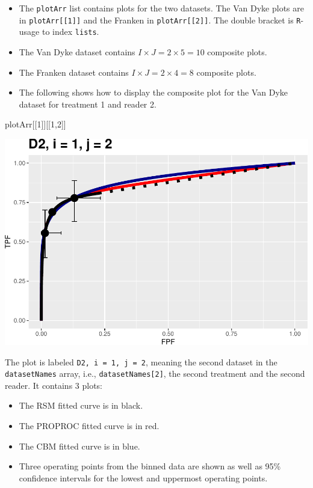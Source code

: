 \documentclass[
]{book}
\newenvironment{Shaded}{\begin{snugshade}}{\end{snugshade}}
\newcommand{\DecValTok}[1]{\textcolor[rgb]{0.00,0.00,0.81}{#1}}
\newcommand{\NormalTok}[1]{#1}
\providecommand{\tightlist}{%
  \setlength{\itemsep}{0pt}\setlength{\parskip}{0pt}}
\begin{document}
\begin{itemize}
\tightlist
\item
  The \texttt{plotArr} list contains plots for the two datasets. The Van Dyke plots are in \texttt{plotArr{[}{[}1{]}{]}} and the Franken in \texttt{plotArr{[}{[}2{]}{]}}. The double bracket is \texttt{R}-usage to index \texttt{lists}.
\item
  The Van Dyke dataset contains \(I \times J = 2 \times 5 = 10\) composite plots.
\item
  The Franken dataset contains \(I \times J = 2 \times 4 = 8\) composite plots.
\item
  The following shows how to display the composite plot for the Van Dyke dataset for treatment 1 and reader 2.
\end{itemize}

\begin{Shaded}
\begin{Highlighting}[]
\NormalTok{plotArr[[}\DecValTok{1}\NormalTok{]][[}\DecValTok{1}\NormalTok{,}\DecValTok{2}\NormalTok{]]}
\end{Highlighting}
\end{Shaded}

\includegraphics{10-rsm-3-fits_files/figure-latex/unnamed-chunk-2-1.pdf}

The plot is labeled \texttt{D2,\ i\ =\ 1,\ j\ =\ 2}, meaning the second dataset in the \texttt{datasetNames} array, i.e., \texttt{datasetNames{[}2{]}}, the second treatment and the second reader. It contains 3 plots:

\begin{itemize}
\tightlist
\item
  The RSM fitted curve is in black.
\item
  The PROPROC fitted curve is in red.
\item
  The CBM fitted curve is in blue.
\item
  Three operating points from the binned data are shown as well as 95\% confidence intervals for the lowest and uppermost operating points.
\end{itemize}
\end{document}
